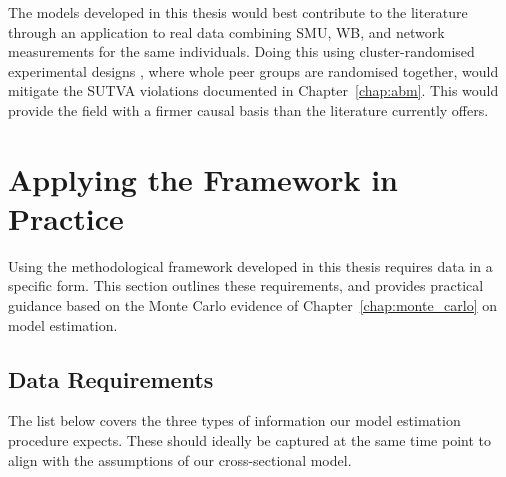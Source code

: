 The models developed in this thesis would best contribute to the literature through an application to real data combining SMU, WB, and network measurements for the same individuals. Doing this using cluster-randomised experimental designs \parencite[Sec.~2.2]{HudgensHalloran2008}, where whole peer groups are randomised together, would mitigate the SUTVA violations documented in Chapter~\ref{chap:abm}. This would provide the field with a firmer causal basis than the literature currently offers.

\section{Applying the Framework in Practice}
\label{sec:discussion_conclusion:practice}
Using the methodological framework developed in this thesis requires data in a specific form. This section outlines these requirements, and provides practical guidance based on the Monte Carlo evidence of Chapter~\ref{chap:monte_carlo} on model estimation.

\subsection{Data Requirements}
\label{sec:discussion_conclusion:data_requirements}
The list below covers the three types of information our model estimation procedure expects. These should ideally be captured at the same time point to align with the assumptions of our cross-sectional model.

